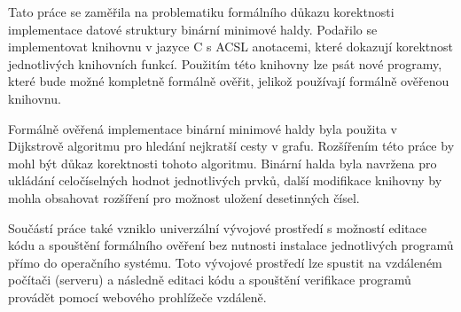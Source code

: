 Tato práce se zaměřila na problematiku formálního důkazu korektnosti implementace datové struktury binární minimové haldy. Podařilo se implementovat knihovnu v jazyce C s ACSL anotacemi, které dokazují korektnost jednotlivých knihovních funkcí. Použitím této knihovny lze psát nové programy, které bude možné kompletně formálně ověřit, jelikož používají formálně ověřenou knihovnu.

Formálně ověřená implementace binární minimové haldy byla použita v Dijkstrově algoritmu pro hledání nejkratší cesty v grafu. Rozšířením této práce by mohl být důkaz korektnosti tohoto algoritmu. Binární halda byla navržena pro ukládání celočíselných hodnot jednotlivých prvků, další modifikace knihovny by mohla obsahovat rozšíření pro možnost uložení desetinných čísel.

Součástí práce také vzniklo univerzální vývojové prostředí s možností editace kódu a spouštění formálního ověření bez nutnosti instalace jednotlivých programů přímo do operačního systému. Toto vývojové prostředí lze spustit na vzdáleném počítači (serveru) a následně editaci kódu a spouštění verifikace programů provádět pomocí webového prohlížeče vzdáleně.